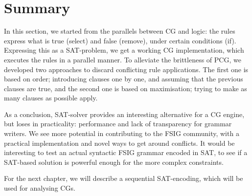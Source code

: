 \section{Summary}

In this section, we started from the parallels between CG and logic:
the rules express what is true ({\sc select}) and false ({\sc remove}), under certain conditions ({\sc if}).
Expressing this as a SAT-problem, we get a working CG implementation, which executes the rules in a parallel manner. 
To alleviate the brittleness of PCG, we developed two approaches to discard conflicting rule applications.
The first one is based on order; introducing clauses one by one, and assuming that the previous clauses are true, 
and the second one is based on maximisation; trying to make as many clauses as possible apply.


As a conclusion, SAT-solver provides an interesting alternative for a CG engine, but loses in practicality: performance and lack of transparency for grammar writers.
We see more potential in contributing to the FSIG community, with a practical implementation and 
novel ways to get around conflicts. It would be interesting to test an actual syntactic FSIG grammar encoded in SAT, to see if a SAT-based solution is powerful enough for the more complex constraints.

For the next chapter, we will describe a sequential SAT-encoding, which will be used for analysing CGs.






